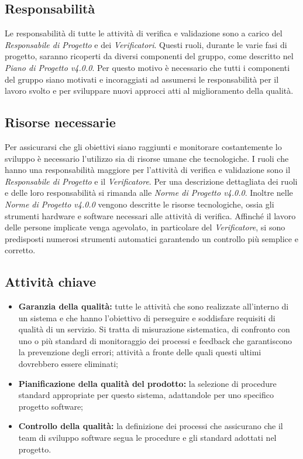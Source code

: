 \subsection{Responsabilità}
Le responsabilità di tutte le attività di verifica e validazione sono a carico del \textit{Responsabile di Progetto} e dei \textit{Verificatori}. Questi ruoli, durante le varie fasi di progetto, saranno ricoperti da diversi componenti del gruppo, come descritto nel \textit{Piano di Progetto v4.0.0}. Per questo motivo è necessario che tutti i componenti del gruppo siano motivati e incoraggiati ad assumersi le responsabilità per il lavoro svolto e per sviluppare nuovi approcci atti al miglioramento della qualità.

\subsection{Risorse necessarie}
Per assicurarsi che gli obiettivi siano raggiunti e monitorare costantemente lo sviluppo è necessario l'utilizzo sia di risorse umane che tecnologiche. I ruoli che hanno una responsabilità maggiore per l'attività di verifica e validazione sono il \textit{Responsabile di Progetto} e il \textit{Verificatore}. Per una descrizione dettagliata dei ruoli e delle loro responsabilità si rimanda alle \textit{Norme di Progetto v4.0.0}. Inoltre nelle \textit{Norme di Progetto v4.0.0} vengono descritte le risorse tecnologiche, ossia gli strumenti hardware e software necessari alle attività di verifica. Affinché il lavoro delle persone implicate venga agevolato, in particolare del \textit{Verificatore}, si sono predisposti numerosi strumenti automatici garantendo un controllo più semplice e corretto.

\subsection{Attività chiave}
\begin{itemize}
	\item \textbf{Garanzia della qualità:} tutte le attività che sono realizzate all'interno di un sistema e che hanno l'obiettivo di perseguire e soddisfare requisiti di qualità di un servizio. Si tratta di misurazione sistematica, di confronto con uno o più standard di monitoraggio dei processi e \gls{feedback} che garantiscono la prevenzione degli errori; attività a fronte delle quali questi ultimi dovrebbero essere eliminati;
	\item \textbf{Pianificazione della qualità del prodotto:} la selezione di procedure standard appropriate per questo sistema, adattandole per uno specifico progetto software;
	\item \textbf{Controllo della qualità:} la definizione dei processi che assicurano che il team  di sviluppo software segua le procedure e gli standard adottati nel progetto.
\end{itemize}
	
